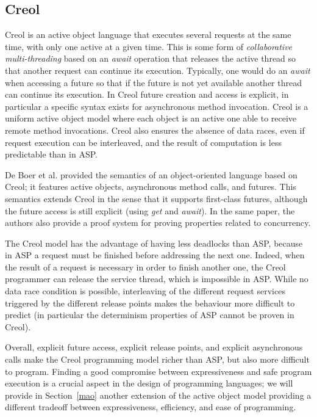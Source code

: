 \subsection{Creol}
Creol \cite{Johnsen2006a,Elinar2006} is an active object language that executes
several requests at the same time, with only one active at a given
time. This is some form of \emph{collaborative multi-threading} based
on an \emph{await} operation that releases the active thread so that
another request can continue its execution. Typically, one would do an
\emph{await} when accessing a future so that if the future is not yet
available another thread can continue its execution. In Creol
\cite{Johnsen2006a} future creation and access is explicit, in
particular a specific syntax exists for asynchronous method
invocation. Creol is a uniform active object model where each object
is an active one able to receive remote method invocations.  Creol
also ensures the absence of data races,
even if
request execution can be interleaved, and the result of computation is
less predictable than in ASP. 


De Boer et al.   \cite{SDE:BoerCJ07}  provided 
the semantics of an
object-oriented language based on Creol; it features
active objects, asynchronous method calls, and futures. This semantics
extends Creol in the sense that it
supports first-class futures, although the future access is  still
explicit (using \emph{get} and \emph{await}). 
In the same paper, the authors also provide a proof system for proving properties
related to concurrency. 

The Creol model has the advantage of having less deadlocks than ASP,
because in ASP a request must be finished before addressing the next one.
Indeed, when the result of a request is necessary in order to finish another
one, the Creol programmer can release the service thread, which is 
impossible in ASP.  While no data race
condition is possible, interleaving of the different request
services triggered by the different release points makes the behaviour
more difficult to predict (in particular the determinism properties of
ASP cannot be proven in Creol).


\smallskip

Overall, explicit future access,
explicit release points, and explicit asynchronous calls make the Creol
programming model richer than ASP, but also more difficult to program.
Finding a good compromise between expressiveness and safe program
execution is a crucial aspect in the design of programming
languages;  we will provide in
Section~\ref{mao} another extension of the active object model
providing a different tradeoff between expressiveness, efficiency, and
ease of programming.



